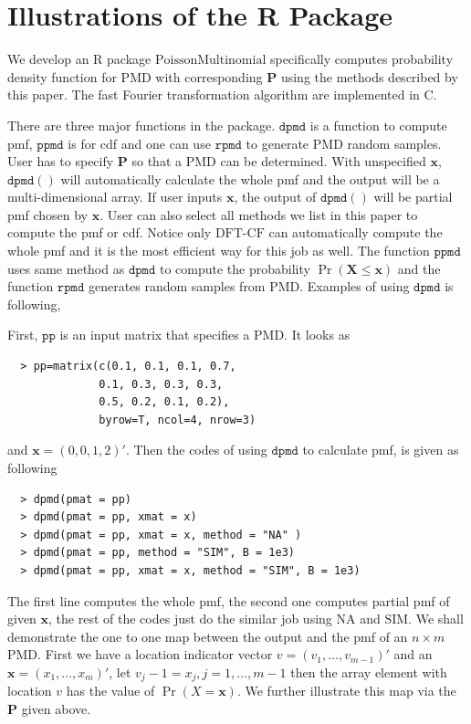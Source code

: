 \documentclass[12pt]{article}
\newcommand{\Pmat}{\mathbf{P}}
\newcommand{\PMD}{\textrm{PMD}}
\newcommand{\Xvec}{\boldsymbol{X}}
\newcommand{\xvec}{\boldsymbol{x}}
\newcommand{\code}{\texttt}
\newcommand{\SIM}{{\textrm{SIM}}}
\newcommand{\NA}{{\textrm{NA}}}
\newcommand{\dft}{{\textrm{DFT-CF}}}
\begin{document}
\section{Illustrations of the R Package}\label{sec:rpackage}
We develop an R package $\textrm{PoissonMultinomial}$ specifically computes probability density function for $\PMD$ with corresponding $\Pmat$ using the methods described by this paper. The fast Fourier transformation algorithm are implemented in C.

There are three major functions in the package. $\code{dpmd}$ is a function to compute pmf, $\code{ppmd}$ is for cdf and one can use $\code{rpmd}$ to generate $\PMD$ random samples. User has to specify $\Pmat$ so that a $\PMD$ can be determined. With unspecified $\xvec$, $\code{dpmd}( )$ will automatically calculate the whole pmf and the output will be a multi-dimensional array. If user inputs $\xvec$, the output of $\code{dpmd}( )$ will be partial pmf chosen by $\xvec$. User can also select all methods we list in this paper to compute the pmf or cdf. Notice only $\dft$ can automatically compute the whole pmf and it is the most efficient way for this job as well. The function $\code{ppmd}$ uses same method as $\code{dpmd}$ to compute the probability $\Pr(\Xvec \leq \xvec)$ and the function $\code{rpmd}$ generates random samples from $\PMD$.  Examples of using $\code{dpmd}$ is following,

First, $\code{pp}$ is an input matrix that specifies a $\PMD$. It looks as
\begin{verbatim}
  > pp=matrix(c(0.1, 0.1, 0.1, 0.7,
              0.1, 0.3, 0.3, 0.3,
              0.5, 0.2, 0.1, 0.2),
              byrow=T, ncol=4, nrow=3)
\end{verbatim}
and $\xvec=(0,0,1,2)'$. Then the codes of using $\code{dpmd}$ to calculate pmf, is given as following
\begin{verbatim}
  > dpmd(pmat = pp)
  > dpmd(pmat = pp, xmat = x)
  > dpmd(pmat = pp, xmat = x, method = "NA" )
  > dpmd(pmat = pp, method = "SIM", B = 1e3)
  > dpmd(pmat = pp, xmat = x, method = "SIM", B = 1e3)
\end{verbatim}
The first line computes the whole pmf, the second one computes partial pmf of given $\xvec$, the rest of the codes just do the similar job using $\NA$ and $\SIM$.
We shall demonstrate the one to one map between the output and the pmf of an $n \times m$ $\PMD$. First we have a location indicator vector $v = (v_1, \dots, v_{m-1})'$ and an $\xvec=(x_1,\dots,x_m)'$, let $v_j-1 = x_j, j =1,\dots,m-1$ then the array element with location $v$ has the value of $\Pr(X=\xvec)$. We further illustrate this map via the $\Pmat$ given above.
\end{document}
